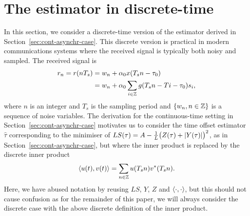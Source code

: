 \documentclass[journal]{IEEEtranTCOM}
\begin{document}
\section{The estimator in discrete-time}\label{sec:discr-asynchr-case}

In this section, we consider a discrete-time version of the estimator derived in Section~\ref{sec:cont-asynchr-case}.  This discrete version is practical in modern communications systems where the received signal is typically both noisy and sampled.  The received signal is
\begin{align}
r_n = r(n T_s) &= w_n + \alpha_0 x(T_sn - \tau_0) \nonumber \\
&= w_n + \alpha_0 \sum_{i\in\ints} g(T_sn - Ti - \tau_0) s_i, \label{eq:rndefn}
\end{align}
where $n$  is an integer and $T_s$ is the sampling period and $\{w_n, n \in {\mathbb Z} \}$ is a sequence of noise variables.  %
The derivation for the continuous-time setting in Section~\ref{sec:cont-asynchr-case} motivates us to consider the time offset estimator $\hat{\tau}$ corresponding to the minimiser of $LS(\tau) =  A - \tfrac{1}{L} \big(Z(\tau) + {\left\vert Y(\tau) \right\vert}\big)^2$, as in Section~\ref{sec:cont-asynchr-case}, but where the inner product is replaced by the discrete inner product
\[
\left\langle u(t) , v(t) \right\rangle = \sum_{n\in{\mathbb Z}}u(T_s n)v^*(T_s n).
\]
Here, we have abused notation by reusing $LS$, $Y$, $Z$ and $\left\langle \cdot , \cdot \right\rangle$, but this should not cause confusion as for the remainder of this paper, we will always consider the discrete case with the above discrete definition of the inner product.
\end{document}
